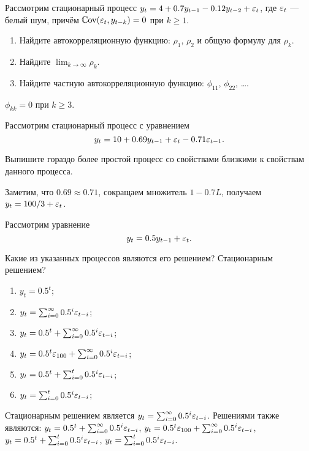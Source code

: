 \begin{problem}
Рассмотрим стационарный процесс $y_t = 4 + 0.7y_{t-1} - 0.12y_{t-2} + \varepsilon_t$, где $\varepsilon_t$ — белый шум, причём $\mathbb{C}\mathrm{ov}(\varepsilon_t, y_{t-k})=0$ при $k \geq 1$.

\begin{enumerate}
  \item Найдите автокорреляционную функцию: $\rho_1$, $\rho_2$ и общую формулу для $\rho_k$.
  \item Найдите $\lim_{k \to \infty} \rho_k$.
  \item Найдите частную автокорреляционную функцию: $\phi_{11}$, $\phi_{22}$, \ldots.
\end{enumerate}
\begin{sol}
  $\phi_{kk}=0$ при $k \geq 3$.
\end{sol}
\end{problem}


\begin{problem}
Рассмотрим стационарный процесс с уравнением
\[
y_t = 10 + 0.69 y_{t-1} + \varepsilon_t - 0.71 \varepsilon_{t-1}.
\]

Выпишите гораздо более простой процесс со свойствами близкими к свойствам данного процесса.
\begin{sol}
Заметим, что $0.69\approx 0.71$, сокращаем множитель $1-0.7L$, получаем $y_t = 100/3 + \varepsilon_t$.
\end{sol}
\end{problem}


\begin{problem}
Рассмотрим уравнение
\[
y_t = 0.5 y_{t-1} + \varepsilon_t.
\]

Какие из указанных процессов являются его решением? Стационарным решением?
\begin{enumerate}
  \item $y_t = 0.5^t$;
  \item $y_t = \sum_{i=0}^{\infty} 0.5^i \varepsilon_{t-i}$;
  \item $y_t = 0.5^t + \sum_{i=0}^{\infty} 0.5^i \varepsilon_{t-i}$;
  \item $y_t = 0.5^t\varepsilon_{100} + \sum_{i=0}^{\infty} 0.5^i \varepsilon_{t-i}$;
  \item $y_t = 0.5^t + \sum_{i=0}^{t} 0.5^i \varepsilon_{t-i}$;
  \item $y_t = \sum_{i=0}^{t} 0.5^i \varepsilon_{t-i}$;
\end{enumerate}


\begin{sol}
Стационарным решением является $y_t = \sum_{i=0}^{\infty} 0.5^i \varepsilon_{t-i}$. Решениями также являются: $y_t = 0.5^t + \sum_{i=0}^{\infty} 0.5^i \varepsilon_{t-i}$, $y_t = 0.5^t\varepsilon_{100} + \sum_{i=0}^{\infty} 0.5^i \varepsilon_{t-i}$, $y_t = 0.5^t + \sum_{i=0}^{t} 0.5^i \varepsilon_{t-i}$, $y_t = \sum_{i=0}^{t} 0.5^i \varepsilon_{t-i}$.
\end{sol}
\end{problem}



